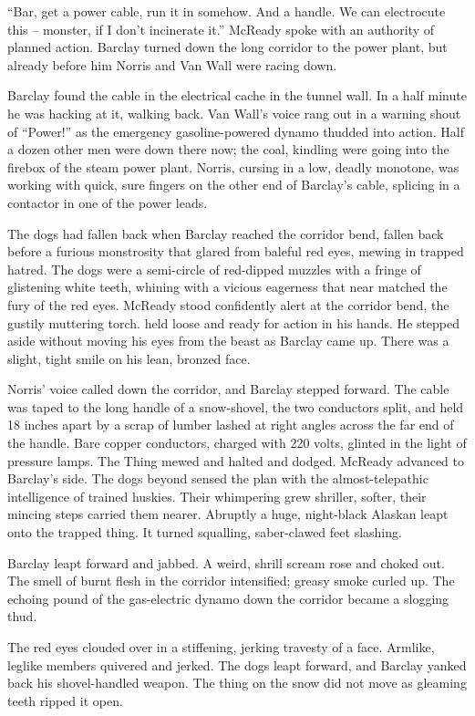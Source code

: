\documentclass[letterpaper,openany,12pt]{memoir}		%
\begin{document}
``Bar, get a power cable, run it in somehow. And a handle. We can electrocute
this -- monster, if I don't incinerate it.'' McReady spoke with an authority of
planned action. Barclay turned down the long corridor to the power plant, but
already before him Norris and Van Wall were racing down.

Barclay found the cable in the electrical cache in the tunnel wall. In a half
minute he was hacking at it, walking back. Van Wall's voice rang out in a
warning shout of ``Power!'' as the emergency gasoline-powered dynamo thudded
into action. Half a dozen other men were down there now; the coal, kindling were
going into the firebox of the steam power plant. Norris, cursing in a low,
deadly monotone, was working with quick, sure fingers on the other end of
Barclay's cable, splicing in a contactor in one of the power leads.

The dogs had fallen back when Barclay reached the corridor bend, fallen back
before a furious monstrosity that glared from baleful red eyes, mewing in
trapped hatred. The dogs were a semi-circle of red-dipped muzzles with a fringe
of glistening white teeth, whining with a vicious eagerness that near matched
the fury of the red eyes. McReady stood confidently alert at the corridor bend,
the gustily muttering torch. held loose and ready for action in his hands. He
stepped aside without moving his eyes from the beast as Barclay came up. There
was a slight, tight smile on his lean, bronzed face.

Norris' voice called down the corridor, and Barclay stepped forward. The cable
was taped to the long handle of a snow-shovel, the two conductors split, and
held 18 inches apart by a scrap of lumber lashed at right angles across the far
end of the handle. Bare copper conductors, charged with 220 volts, glinted in
the light of pressure lamps. The Thing mewed and halted and dodged. McReady
advanced to Barclay's side. The dogs beyond sensed the plan with the
almost-telepathic intelligence of trained huskies. Their whimpering grew
shriller, softer, their mincing steps carried them nearer. Abruptly a huge,
night-black Alaskan leapt onto the trapped thing. It turned squalling,
saber-clawed feet slashing.

Barclay leapt forward and jabbed. A weird, shrill scream rose and choked out.
The smell of burnt flesh in the corridor intensified; greasy smoke curled up.
The echoing pound of the gas-electric dynamo down the corridor became a slogging
thud.

The red eyes clouded over in a stiffening, jerking travesty of a face. Armlike,
leglike members quivered and jerked. The dogs leapt forward, and Barclay yanked
back his shovel-handled weapon. The thing on the snow did not move as gleaming
teeth ripped it open.
\end{document}
